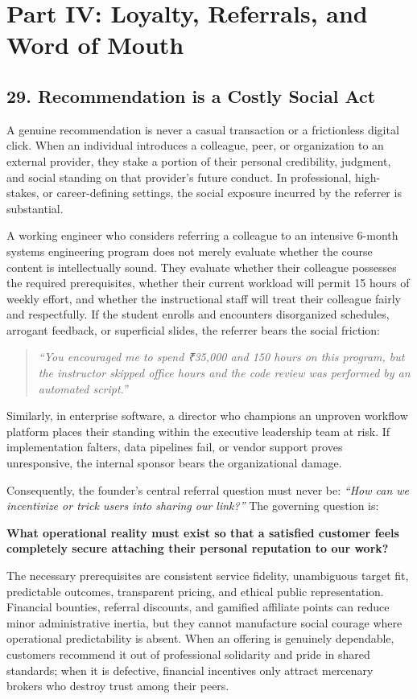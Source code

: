 \section*{Part IV: Loyalty, Referrals, and Word of Mouth}

\subsection*{29. Recommendation is a Costly Social Act}

A genuine recommendation is never a casual transaction or a frictionless digital click. When an individual introduces a colleague, peer, or organization to an external provider, they stake a portion of their personal credibility, judgment, and social standing on that provider's future conduct. In professional, high-stakes, or career-defining settings, the social exposure incurred by the referrer is substantial. 

A working engineer who considers referring a colleague to an intensive 6-month systems engineering program does not merely evaluate whether the course content is intellectually sound. They evaluate whether their colleague possesses the required prerequisites, whether their current workload will permit 15 hours of weekly effort, and whether the instructional staff will treat their colleague fairly and respectfully. If the student enrolls and encounters disorganized schedules, arrogant feedback, or superficial slides, the referrer bears the social friction:
\begin{quote}
\textit{``You encouraged me to spend ₹35,000 and 150 hours on this program, but the instructor skipped office hours and the code review was performed by an automated script.''}
\end{quote}
Similarly, in enterprise software, a director who champions an unproven workflow platform places their standing within the executive leadership team at risk. If implementation falters, data pipelines fail, or vendor support proves unresponsive, the internal sponsor bears the organizational damage.

Consequently, the founder's central referral question must never be: \textit{``How can we incentivize or trick users into sharing our link?''} The governing question is:
\begin{center}
\textbf{What operational reality must exist so that a satisfied customer feels completely secure attaching their personal reputation to our work?}
\end{center}
The necessary prerequisites are consistent service fidelity, unambiguous target fit, predictable outcomes, transparent pricing, and ethical public representation. Financial bounties, referral discounts, and gamified affiliate points can reduce minor administrative inertia, but they cannot manufacture social courage where operational predictability is absent. When an offering is genuinely dependable, customers recommend it out of professional solidarity and pride in shared standards; when it is defective, financial incentives only attract mercenary brokers who destroy trust among their peers.

